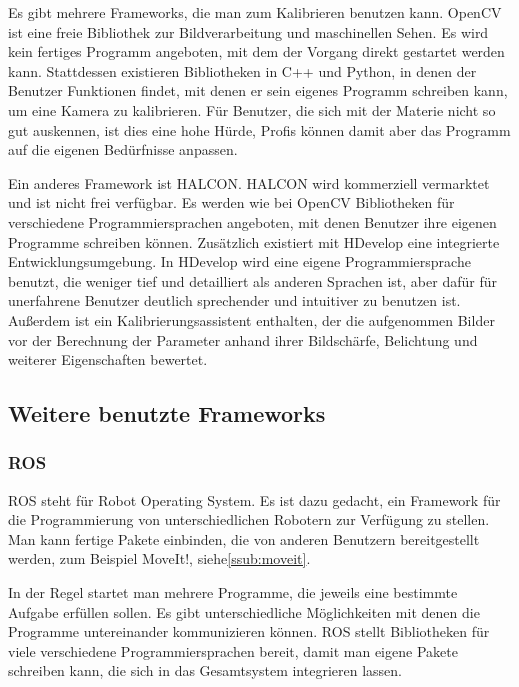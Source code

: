 Es gibt mehrere Frameworks, die man zum Kalibrieren benutzen kann. OpenCV ist eine freie Bibliothek zur Bildverarbeitung und maschinellen Sehen. Es wird kein fertiges Programm angeboten, mit dem der Vorgang direkt gestartet werden kann. Stattdessen existieren Bibliotheken in C++ und Python, in denen der Benutzer Funktionen findet, mit denen er sein eigenes Programm schreiben kann, um eine Kamera zu kalibrieren. Für Benutzer, die sich mit der Materie nicht so gut auskennen, ist dies eine hohe Hürde, Profis können damit aber das Programm auf die eigenen Bedürfnisse anpassen.

Ein anderes Framework ist HALCON. HALCON wird kommerziell vermarktet und ist nicht frei verfügbar. Es werden wie bei OpenCV Bibliotheken für verschiedene Programmiersprachen angeboten, mit denen Benutzer ihre eigenen Programme schreiben können. Zusätzlich existiert mit HDevelop eine integrierte Entwicklungsumgebung. In HDevelop wird eine eigene Programmiersprache benutzt, die weniger tief und detailliert als anderen Sprachen ist, aber dafür für unerfahrene Benutzer deutlich sprechender und intuitiver zu benutzen ist. Außerdem ist ein Kalibrierungsassistent enthalten, der die aufgenommen Bilder vor der Berechnung der Parameter anhand ihrer Bildschärfe, Belichtung und weiterer Eigenschaften bewertet.

\subsection{Weitere benutzte Frameworks} %
\label{sub:weitere_benutzte_frameworks}
\subsubsection{ROS} %
\label{ssub:ros}
ROS \cite{ROS} steht für Robot Operating System. Es ist dazu gedacht, ein Framework für die Programmierung von unterschiedlichen Robotern zur Verfügung zu stellen. Man kann fertige Pakete einbinden, die von anderen Benutzern bereitgestellt werden, zum Beispiel MoveIt!, siehe\autoref{ssub:moveit}.

In der Regel startet man mehrere Programme, die jeweils eine bestimmte Aufgabe erfüllen sollen. Es gibt unterschiedliche Möglichkeiten mit denen die Programme untereinander kommunizieren können. ROS stellt Bibliotheken für viele verschiedene Programmiersprachen bereit, damit man eigene Pakete schreiben kann, die sich in das Gesamtsystem integrieren lassen.


